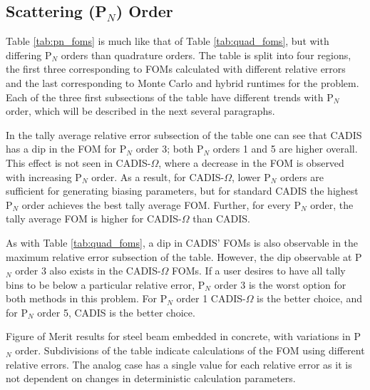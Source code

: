 
\subsection{Scattering (P$_N$) Order}
\label{subsec:pnorder}

Table \ref{tab:pn_foms} is much like that of Table \ref{tab:quad_foms}, but with
differing P$_N$ orders than quadrature orders. The table is split into four
regions, the first three corresponding to FOMs calculated with
different relative errors and the last corresponding to Monte Carlo and hybrid
runtimes for the problem. Each of the three first subsections of the table have
different trends with P$_N$ order, which will be described in the next several
paragraphs.

In the tally average relative error subsection of the table one can see that
CADIS has a dip in the FOM for P$_N$ order 3; both P$_N$ orders 1 and 5 are
higher overall. This effect is not seen in CADIS-$\Omega$, where a decrease in
the FOM is observed with increasing P$_N$ order. As a result, for
CADIS-$\Omega$, lower P$_N$ orders are sufficient for generating biasing
parameters, but for standard CADIS the highest P$_N$ order achieves the best
tally average FOM. Further, for every P$_N$ order, the tally average FOM is
higher for CADIS-$\Omega$ than CADIS.

As with Table \ref{tab:quad_foms}, a dip in CADIS' FOMs is also observable in the
maximum relative error subsection of the table. However, the dip observable at
P$_N$ order 3 also exists in the CADIS-$\Omega$ FOMs. If a user desires to have all
tally bins to be below a particular relative error, P$_N$ order 3 is the worst
option for both methods in this problem. For P$_N$ order 1 CADIS-$\Omega$ is the
better choice, and for P$_N$ order 5, CADIS is the better choice.

\begin{table}[h!]
  \centering
  
  \caption[Figure of Merit results for steel beam embedded in concrete, with
  variations in P$_{N}$ order.]{Figure of Merit results for steel beam embedded in concrete, with
    variations in P$_{N}$ order. Subdivisions of the table indicate
calculations of the FOM using different relative errors. The analog case has a
single value for each relative error as it is not dependent on changes in
deterministic calculation parameters.}
  \label{tab:pn_foms}
\end{table}

